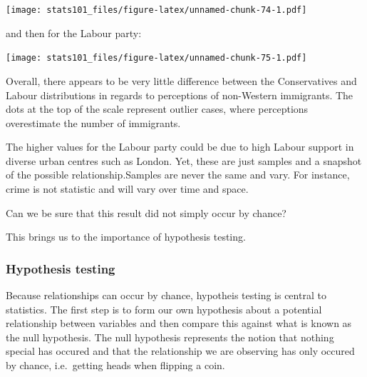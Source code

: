 \documentclass[]{article}
\newenvironment{Shaded}{\begin{snugshade}}{\end{snugshade}}
\newcommand{\DataTypeTok}[1]{\textcolor[rgb]{0.13,0.29,0.53}{#1}}
\newcommand{\DecValTok}[1]{\textcolor[rgb]{0.00,0.00,0.81}{#1}}
\newcommand{\KeywordTok}[1]{\textcolor[rgb]{0.13,0.29,0.53}{\textbf{#1}}}
\newcommand{\NormalTok}[1]{#1}
\newcommand{\OperatorTok}[1]{\textcolor[rgb]{0.81,0.36,0.00}{\textbf{#1}}}
\newcommand{\OtherTok}[1]{\textcolor[rgb]{0.56,0.35,0.01}{#1}}
\newcommand{\StringTok}[1]{\textcolor[rgb]{0.31,0.60,0.02}{#1}}
\begin{document}
\texttt{[image: stats101\_files/figure-latex/unnamed-chunk-74-1.pdf]}

and then for the Labour party:

\begin{Shaded}
\end{Shaded}

\texttt{[image: stats101\_files/figure-latex/unnamed-chunk-75-1.pdf]}

Overall, there appears to be very little difference between the Conservatives and Labour distributions in regards to perceptions of non-Western immigrants. The dots at the top of the scale represent outlier cases, where perceptions overestimate the number of immigrants.

The higher values for the Labour party could be due to high Labour support in diverse urban centres such as London. Yet, these are just samples and a snapshot of the possible relationship.Samples are never the same and vary. For instance, crime is not statistic and will vary over time and space.

Can we be sure that this result did not simply occur by chance?

This brings us to the importance of hypothesis testing.

\hypertarget{hypothesis-testing}{%
\subsubsection{Hypothesis testing}\label{hypothesis-testing}}

Because relationships can occur by chance, hypotheis testing is central to statistics. The first step is to form our own hypothesis about a potential relationship between variables and then compare this against what is known as the null hypothesis. The null hypothesis represents the notion that nothing special has occured and that the relationship we are observing has only occured by chance, i.e.~getting heads when flipping a coin.
\end{document}
